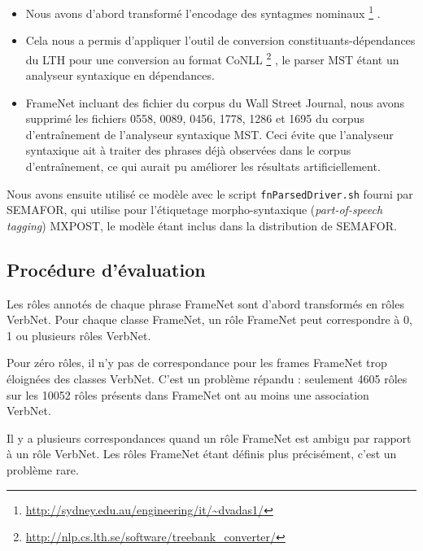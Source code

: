 \begin{itemize}
    \item Nous avons d'abord transformé l'encodage des syntagmes nominaux
        \footnote{\url{http://sydney.edu.au/engineering/it/~dvadas1/}}
        \citep{vadas2007adding}.
    \item Cela nous a permis d'appliquer l'outil de conversion
        constituants-dépendances du LTH pour une conversion au format CoNLL
        \footnote{\url{http://nlp.cs.lth.se/software/treebank_converter/}}
        \citep{johansson2007extended}, le parser MST étant un analyseur
        syntaxique en dépendances.
    \item FrameNet incluant des fichier du corpus du Wall Street
        Journal, nous avons supprimé les fichiers 0558, 0089, 0456, 1778, 1286
        et 1695 du corpus d'entraînement de l'analyseur syntaxique MST. Ceci
        évite que l'analyseur syntaxique ait à traiter des phrases déjà
        observées dans le corpus d'entraînement, ce qui aurait pu améliorer les
        résultats artificiellement.
\end{itemize}

Nous avons ensuite utilisé ce modèle avec le script \verb=fnParsedDriver.sh=
fourni par SEMAFOR, qui utilise pour l'étiquetage morpho-syntaxique
(\textit{part-of-speech tagging}) MXPOST, le modèle étant inclus dans la
distribution de SEMAFOR.

\subsection{Procédure d'évaluation}

Les rôles annotés de chaque phrase FrameNet sont d'abord transformés en rôles
VerbNet. Pour chaque classe FrameNet, un rôle FrameNet peut correspondre à 0, 1
ou plusieurs rôles VerbNet.

Pour zéro rôles, il n'y pas de correspondance pour les frames FrameNet trop
éloignées des classes VerbNet. C'est un problème répandu : seulement 4605 rôles
sur les 10052 rôles présents dans FrameNet ont au moins une association
VerbNet.


Il y a plusieurs correspondances quand un rôle FrameNet est ambigu par rapport
à un rôle VerbNet. Les rôles FrameNet étant définis plus précisément, c'est un
problème rare.

